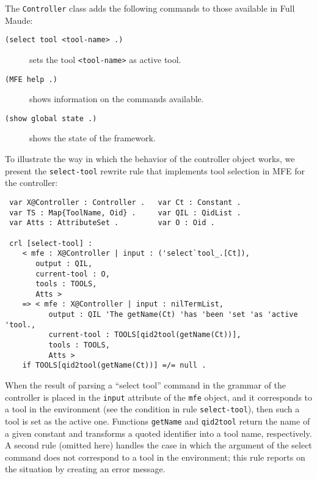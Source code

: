 The \verb~Controller~ class adds the following commands to those available in Full Maude:
\begin{description}
\item[\verb~(select tool <tool-name> .)~] sets the tool \verb~<tool-name>~ as active tool.
\item[\verb~(MFE help .)~] shows information on the commands available.
\item[\verb~(show global state .)~] shows the state of the framework.
\end{description}
%
To illustrate the way in which the behavior of the controller object works, we present the
{\tt select-tool} rewrite rule that implements tool selection in MFE for the
controller:

\begin{small}
\begin{verbatim}
 var X@Controller : Controller .   var Ct : Constant .       
 var TS : Map{ToolName, Oid} .     var QIL : QidList .       
 var Atts : AttributeSet .         var O : Oid .  
   
 crl [select-tool] :
    < mfe : X@Controller | input : ('select`tool_.[Ct]), 
       output : QIL, 
       current-tool : O, 
       tools : TOOLS, 
       Atts >
    => < mfe : X@Controller | input : nilTermList, 
          output : QIL 'The getName(Ct) 'has 'been 'set 'as 'active 'tool., 
          current-tool : TOOLS[qid2tool(getName(Ct))], 
          tools : TOOLS, 
          Atts > 
    if TOOLS[qid2tool(getName(Ct))] =/= null .
\end{verbatim}
\end{small}
%
When the result of parsing a ``select tool'' command in the grammar of the controller is placed 
in the \texttt{input} attribute of the \texttt{mfe} object, and it corresponds to a tool in
the environment (see the condition in rule \texttt{select-tool}),
then such a tool is set as the active one. Functions \texttt{getName} and \texttt{qid2tool} 
return the name of a given constant and transforms a quoted identifier into a tool name, respectively. 
A second rule (omitted here) handles the case in which the argument of the select command 
does not correspond to a tool in the environment; this rule reports on 
the situation by creating an error message.

